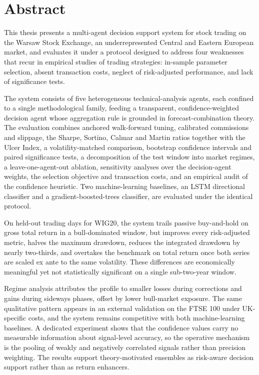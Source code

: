 \chapter*{Abstract}

This thesis presents a multi-agent decision support system for stock trading on the Warsaw Stock Exchange, an underrepresented Central and Eastern European market, and evaluates it under a protocol designed to address four weaknesses that recur in empirical studies of trading strategies: in-sample parameter selection, absent transaction costs, neglect of risk-adjusted performance, and lack of significance tests.

The system consists of five heterogeneous technical-analysis agents, each confined to a single methodological family, feeding a transparent, confidence-weighted decision agent whose aggregation rule is grounded in forecast-combination theory. The evaluation combines anchored walk-forward tuning, calibrated commissions and slippage, the Sharpe, Sortino, Calmar and Martin ratios together with the Ulcer Index, a volatility-matched comparison, bootstrap confidence intervals and paired significance tests, a decomposition of the test window into market regimes, a leave-one-agent-out ablation, sensitivity analyses over the decision-agent weights, the selection objective and transaction costs, and an empirical audit of the confidence heuristic. Two machine-learning baselines, an LSTM directional classifier and a gradient-boosted-trees classifier, are evaluated under the identical protocol.

On \OOSDays{} held-out trading days for WIG20, the system trails passive buy-and-hold on gross total return in a bull-dominated window, but improves every risk-adjusted metric, halves the maximum drawdown, reduces the integrated drawdown by nearly two-thirds, and overtakes the benchmark on total return once both series are scaled ex ante to the same volatility. These differences are economically meaningful yet not statistically significant on a single sub-two-year window.

Regime analysis attributes the profile to smaller losses during corrections and gains during sideways phases, offset by lower bull-market exposure. The same qualitative pattern appears in an external validation on the FTSE 100 under UK-specific costs, and the system remains competitive with both machine-learning baselines. A dedicated experiment shows that the confidence values carry no measurable information about signal-level accuracy, so the operative mechanism is the pooling of weakly and negatively correlated signals rather than precision weighting. The results support theory-motivated ensembles as risk-aware decision support rather than as return enhancers.


